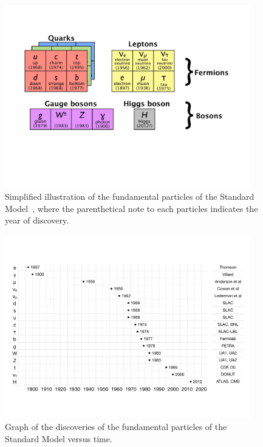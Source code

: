\begin{figure}[tp]
  \centering
  \includegraphics[width=0.95\textwidth]{figures/standardmodel/sm-content-2}
  \caption{Simplified illustration of the fundamental particles of the Standard Model~\cite{2013.thesis.ryan}, where the parenthetical note to each particles indicates the year of discovery.}
  \label{fig:sm-particles-1}
\end{figure}

\begin{figure}[tp]
  \centering
  \includegraphics[width=0.95\textwidth]{figures/standardmodel/discoveries}
  \caption{Graph of the discoveries of the fundamental particles of the Standard Model versus time.}
  \label{fig:sm-particles-2}
\end{figure}

